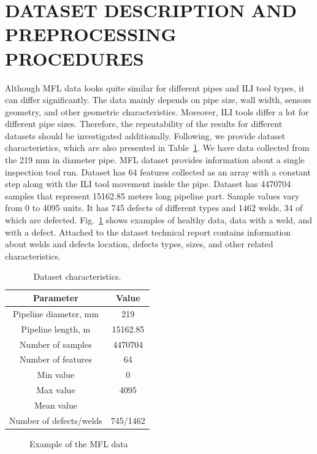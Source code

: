 \section{DATASET DESCRIPTION AND PREPROCESSING PROCEDURES}
\label{DATASET DESCRIPTION AND PREPROCESSING PROCEDURES}
Although MFL data looks quite similar for different pipes and ILI tool types, it can differ significantly.
The data mainly depends on pipe size, wall width, sensors geometry, and other geometric characteristics.
Moreover, ILI tools differ a lot for different pipe sizes.
Therefore, the repeatability of the results for different datasets should be investigated additionally.
Following, we provide dataset characteristics, which are also presented in Table~\ref{tab:dataset}.
We have data collected from the 219 mm in diameter pipe.
MFL dataset provides information about a single inspection tool run.
Dataset has 64 features collected as an array with a constant step along with the ILI tool movement inside the pipe.
Dataset has 4470704 samples that represent 15162.85 meters long pipeline part.
Sample values vary from 0 to 4095 units.
It has 745 defects of different types and 1462 welds, 34 of which are defected.
Fig.~\ref{ris:defect_example} shows examples of healthy data, data with a weld, and with a defect.
Attached to the dataset technical report contains information about welds and defects location, defects types, sizes, and other related characteristics.
\begin{table}[!htb]
	\caption{Dataset characteristics.}
	\begin{center}
		\small
		\begin{tabular}{  c | c   }
			\hline
			Parameter & Value \\
			\hline
			Pipeline diameter, mm &  219 \\
			Pipeline length, m &  15162.85 \\
			Number of samples &  4470704 \\
			Number of features & 64 \\
			Min value & 0 \\
			Max value & 4095 \\
			Mean value &   \\
			Number of defects/welds & 745/1462 \\
			\hline
		\end{tabular}
		\label{tab:dataset}
	\end{center}
\end{table}

\begin{figure}[ht]
	\caption{Example of the MFL data}
	\label{ris:defect_example}
\end{figure}

